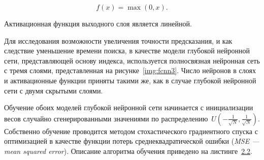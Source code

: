 
\begin{equation}\label{eq:deq01}
    f(x) = \max (0, x).
\end{equation}

Активационная функция выходного слоя является линейной.

Для исследования возможности увеличения точности предсказания, и как следствие
уменьшение времени поиска, в качестве модели глубокой нейронной сети,
представляющей основу индекса, используется полносвязная нейронная сеть с тремя
слоями, представленная на рисунке~\ref{img:fcnn3}. Число нейронов в слоях и
активационные функции приняты такими же, как в случае глубокой нейронной сети с
двумя скрытыми слоями.


Обучение обоих моделей глубокой нейронной сети начинается с инициализации весов
случайно сгенерированными значениями по распределению~$U(-\frac{1}{\sqrt{N}},
\frac{1}{\sqrt{N}})$. Собственно обучение проводится методом стохастического
градиентного спуска с оптимизацией в качестве функции потерь
среднеквадратической ошибки (\textit{MSE --- mean squared error}). Описание
алгоритма обучения приведено на листинге~\hyperref[alg:sdg]{2.2}. 
\vspace{1.5cm}

